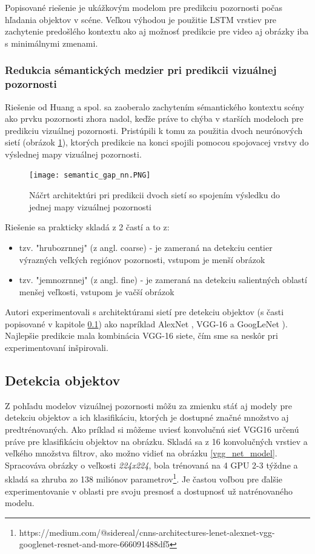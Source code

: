 Popisované riešenie je ukážkovým modelom pre predikciu pozornosti počas hľadania objektov v scéne. Veľkou výhodou je použitie LSTM vrstiev pre zachytenie predošlého kontextu ako aj možnosť predikcie pre video aj obrázky iba s minimálnymi zmenami.

\subsubsection{Redukcia sémantických medzier pri predikcii vizuálnej pozornosti}

\label{semantic_gap}

Riešenie od Huang a spol. \cite{salicon_semantic_gap} sa zaoberalo zachytením sémantického kontextu scény ako prvku pozornosti zhora nadol, keďže práve to chýba v starších modeloch pre predikciu vizuálnej pozornosti. Pristúpili k tomu za použitia dvoch neurónových sietí (obrázok \ref{semantic_gap_nn}), ktorých predikcie na konci spojili pomocou spojovacej vrstvy do výslednej mapy vizuálnej pozornosti.  

\begin{figure}[H]
	\texttt{[image: semantic\_gap\_nn.PNG]}
	\caption[Model redukcie sémantických medzier pri predikcii pozornosti]{Náčrt architektúri pri predikcii dvoch sietí so spojením výsledku do jednej mapy vizuálnej pozornosti}\label{semantic_gap_nn}
\end{figure}

Riešenie sa prakticky skladá z 2 častí a to z:
\begin{itemize}
	\item tzv. "hrubozrnnej" (z angl. coarse) - je zameraná na detekciu centier výrazných veľkých regiónov pozornosti, vstupom je menší obrázok
	\item tzv. "jemnozrnnej" (z angl. fine) - je zameraná na detekciu salientných oblastí menšej veľkosti, vstupom je vačší obrázok
\end{itemize}

Autori experimentovali s architektúrami sietí pre detekciu objektov (s časti popisované v kapitole \ref{object_detection}) ako napríklad AlexNet \cite{alexnet}, VGG-16 \cite{vgg16} a GoogLeNet \cite{googlenet}). Najlepšie predikcie mala kombinácia VGG-16 siete, čím sme sa neskôr pri experimentovaní inšpirovali. 

\subsection{Detekcia objektov}
\label{object_detection}
Z pohľadu modelov vizuálnej pozornosti môžu za zmienku stáť aj modely pre detekciu objektov a ich klasifikáciu, ktorých je dostupné značné množstvo aj predtrénovaných. Ako príklad si môžeme uviesť konvolučnú sieť VGG16\cite{vgg_net} určenú práve pre klasifikáciu objektov na obrázku. Skladá sa z 16 konvolučných vrstiev a veľkého množstva filtrov, ako možno vidieť na obrázku \ref{vgg_net_model}. Spracováva obrázky o veľkosti \textit{224x224}, bola trénovaná na 4 GPU 2-3 týždne a skladá sa zhruba zo 138 miliónov parametrov\footnote{https://medium.com/@sidereal/cnns-architectures-lenet-alexnet-vgg-googlenet-resnet-and-more-666091488df5}.  Je častou voľbou pre ďalšie experimentovanie v oblasti pre svoju presnosť a dostupnosť už natrénovaného modelu.

